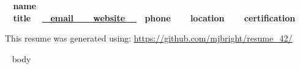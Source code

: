\documentclass[11pt,english]{article}
\begin{document}

\begin{center}
\huge\bf\color{maincolor} ~{{ name }}~  \\
\small\color{black} ~{{ title }}~
\small\color{black} \href{mailto: ~{{ email }}~ }{ ~{{ email }}~ } 
\small\color{black} \href{ ~{{ website }}~ }{ ~{{ website }}~ } 
\small\color{black} ~{{ phone }}~
\small\color{black} ~{{ location }}~
\small\color{black} ~{{ certification }}~

\end{center}

\begin{flushright}
\vspace{3.5mm}
\tiny This resume was generated using: \url{https://github.com/mjbright/resume\_42/}
\end{flushright}

\vspace{-18mm}

~{{ body }}~
\end{document}
